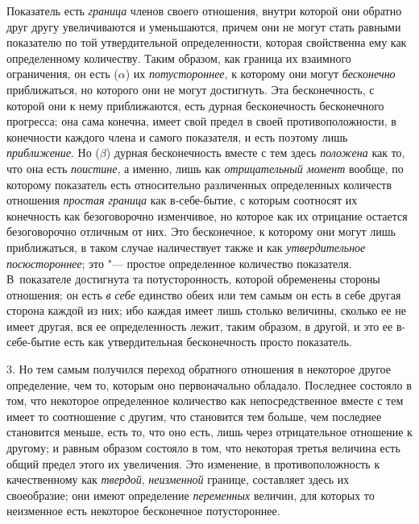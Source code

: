 Показатель есть {\em граница} членов своего отношения,
внутри которой они обратно друг другу увеличиваются и уменьшаются, причем
они не могут стать равными показателю по той утвердительной определенности,
которая свойственна ему как определенному количеству. Таким образом, как
граница их взаимного ограничения, он есть ($\alpha $) их {\em потустороннее},
к которому они могут {\em бесконечно} приближаться, но которого они не могут
достигнуть. Эта бесконечность, с которой они к нему приближаются, есть
дурная бесконечность бесконечного прогресса; она сама конечна, имеет свой
предел в своей противоположности, в конечности каждого члена и самого
показателя, и есть поэтому лишь {\em приближение}. Но
({\em $\beta $}) дурная бесконечность вместе с тем
здесь {\em положена} как то, что она есть
{\em поистине}, а именно, лишь как
{\em отрицательный момент} вообще, по которому
показатель есть относительно различенных определенных количеств отношения
{\em простая граница} как в-себе-бытие, с которым
соотносят их конечность как безоговорочно изменчивое, но которое как их
отрицание остается безоговорочно отличным от них. Это бесконечное, к
которому они могут лишь приближаться, в таком случае наличествует также и
как {\em утвердительное посюстороннее}; это "--- простое
определенное количество показателя. В~показателе достигнута та
потусторонность, которой обременены стороны отношения; он есть
{\em в себе} единство обеих или тем самым он есть в
себе другая сторона каждой из них; ибо каждая имеет лишь столько величины,
сколько ее не имеет другая, вся ее определенность лежит, таким образом, в
другой, и это ее в-себе-бытие есть как утвердительная бесконечность просто
показатель.

3. Но тем самым получился переход обратного отношения в некоторое другое
определение, чем то, которым оно первоначально обладало. Последнее состояло
в том, что некоторое определенное количество как непосредственное вместе с
тем имеет то соотношение с другим, что становится тем больше, чем последнее
становится меньше, есть то, что оно есть, лишь через отрицательное
отношение к другому; и равным образом состояло в том, что некоторая третья
величина есть общий предел этого их увеличения. Это изменение, в
противоположность к качественному как {\em твердой},
{\em неизменной} границе, составляет здесь их
своеобразие; они имеют определение {\em переменных}
величин, для которых то неизменное есть некоторое бесконечное
потустороннее.

